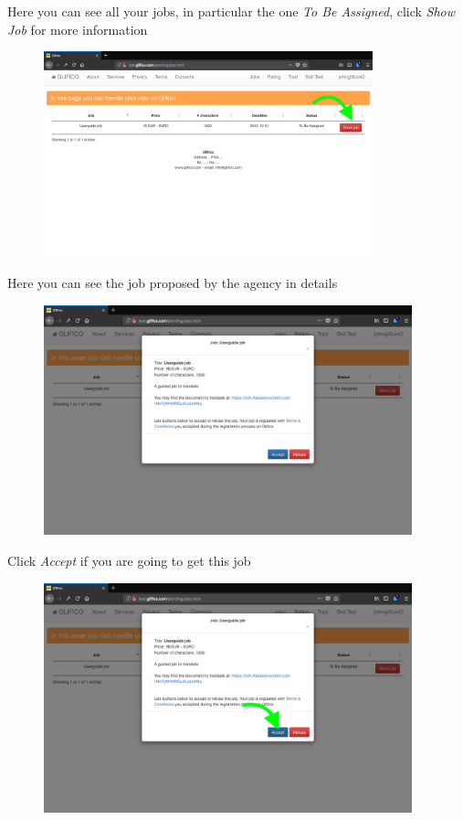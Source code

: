 \documentclass[11 pt, a4paper]{article}
\begin{document}
Here you can see all your jobs, in particular the one \textit{To Be Assigned}, click \textit{Show Job} for more information
\begin{figure}[H]
\centering
\includegraphics[width=0.85\textwidth]{translator_job1.png}
\end{figure}


\clearpage
Here you can see the job proposed by the agency in details
\begin{figure}[H]
\centering
\includegraphics[width=0.95\textwidth]{translator_job2.png}
\end{figure}

Click \textit{Accept} if you are going to get this job
\begin{figure}[H]
\centering
\includegraphics[width=0.95\textwidth]{translator_job3.png}
\end{figure}
\end{document}
